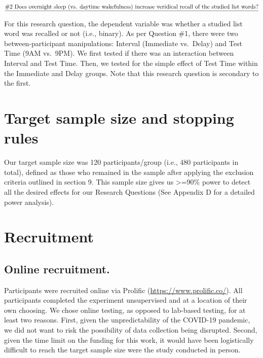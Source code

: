 \documentclass[
]{article}
\begin{document}
\(\text{\underline{\#2 Does overnight sleep (vs. daytime wakefulness) increase veridical recall of the studied list words?}}\)

For this research question, the dependent variable was whether a studied list word was recalled or not (i.e., binary). As per Question \#1, there were two between-participant manipulations: Interval (Immediate vs.~Delay) and Test Time (9AM vs.~9PM). We first tested if there was an interaction between Interval and Test Time. Then, we tested for the simple effect of Test Time within the Immediate and Delay groups. Note that this research question is secondary to the first.

\hypertarget{target-sample-size-and-stopping-rules}{%
\section{Target sample size and stopping rules}\label{target-sample-size-and-stopping-rules}}

Our target sample size was 120 participants/group (i.e., 480 participants in total), defined as those who remained in the sample after applying the exclusion criteria outlined in section 9. This sample size gives us \textgreater=90\% power to detect all the desired effects for our Research Questions (See Appendix D for a detailed power analysis).

\hypertarget{recruitment}{%
\section{Recruitment}\label{recruitment}}

\hypertarget{online-recruitment.}{%
\subsection{Online recruitment.}\label{online-recruitment.}}

Participants were recruited online via Prolific (\url{https://www.prolific.co/}). All participants completed the experiment unsupervised and at a location of their own choosing. We chose online testing, as opposed to lab-based testing, for at least two reasons. First, given the unpredictability of the COVID-19 pandemic, we did not want to risk the possibility of data collection being disrupted. Second, given the time limit on the funding for this work, it would have been logistically difficult to reach the target sample size were the study conducted in person.
\end{document}
